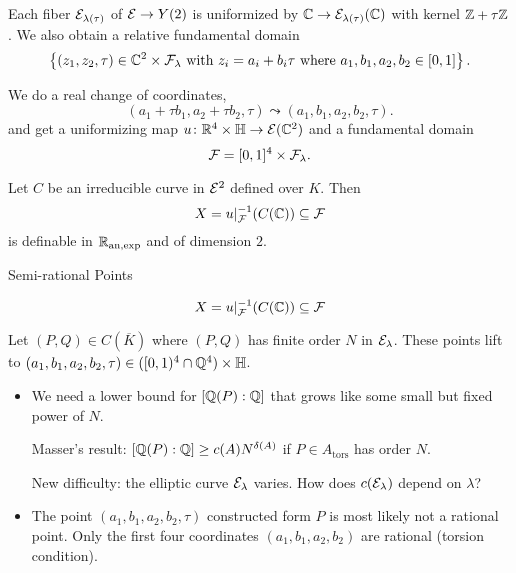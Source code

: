 \documentclass{beamer}
\begin{document}
\begin{frame}
  Each fiber ${\mathcal E}_{\lambda(\tau)}$ of ${\mathcal E}\rightarrow Y(2)$ is
  uniformized by ${\mathbb{C}}\rightarrow {\mathcal E}_{\lambda(\tau)}({\mathbb{C}})$ with kernel
  ${\mathbb{Z}}+\tau{\mathbb{Z}}$.
  We also obtain a relative fundamental domain
  \begin{equation*}
     \left\{(z_1,z_2,\tau) \in
    {\mathbb{C}}^2\times {\mathcal F}_{\lambda} \text{ with }z_i=a_i+b_i\tau\text{
      where }a_1,b_1,a_2,b_2\in [0,1]  \right\}. 
  \end{equation*}

  We do a real change of coordinates,
  $$ (a_1+\tau b_1,a_2 + \tau
  b_2,\tau)\leadsto (a_1,b_1,a_2,b_2,\tau).$$
  and get a uniformizing map $u\colon{\mathbb{R}}^4 \times {\mathbb{H}}\rightarrow{\mathcal E}({\mathbb{C}}^2)$
  and a fundamental domain
  \begin{equation*}
    {\mathcal F} = [0,1]^4\times {\mathcal F}_{\lambda}. 
  \end{equation*}

  Let $C$ be an irreducible curve in ${\mathcal E}^2$ defined over $K$. Then
  \begin{equation*}
    X = u|_{{\mathcal F}}^{-1}(C({\mathbb{C}})) \subseteq {\mathcal F}
  \end{equation*}
  is definable in ${{\mathbb{R}}_{\mathrm{an,exp}}}$ and of dimension $2$. 
\end{frame}


\begin{frame}{Semi-rational Points}
  
  \begin{equation*}
    X = u|_{{\mathcal F}}^{-1}(C({\mathbb{C}})) \subseteq {\mathcal F}
  \end{equation*}

  Let $(P,Q) \in C(\overline K)$ where $(P,Q)$ has finite order $N$
  in ${\mathcal E}_\lambda$. 
  These points lift to $(a_1,b_1,a_2,b_2,\tau)\in
  ([0,1)^4\cap{\mathbb{Q}}^4)\times{\mathbb{H}}$.

  
  \begin{itemize}
  \item  We need a lower bound for $[{\mathbb{Q}}(P):{\mathbb{Q}}]$ that grows like
    some small but fixed power of $N$.

    Masser's result: $[{\mathbb{Q}}(P):{\mathbb{Q}}] \ge c(A) N^{\delta(A)}$ if
    $P\in A_{\mathrm{tors}}$ has order $N$. 

    New difficulty: the
    elliptic curve ${\mathcal E}_{\lambda}$ \alert{varies}. How does
    $c({\mathcal E}_{\lambda})$ depend on $\lambda$?
    
  \item The point $(a_1,b_1,a_2,b_2,\tau)$ constructed form $P$ is
    most likely
    \alert{not} a rational point. Only the first four
    coordinates $(a_1,b_1,a_2,b_2)$ are rational
    (torsion condition).
  \end{itemize}
\end{frame}
\end{document}
